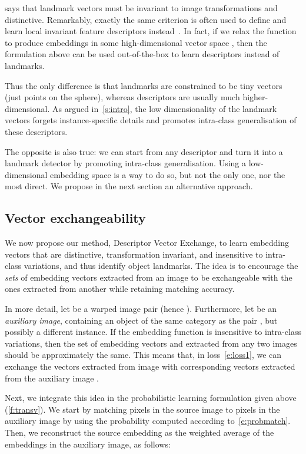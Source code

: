 \documentclass[10pt,twocolumn,letterpaper]{article}
\begin{document}
 says that landmark vectors must be invariant to image transformations and distinctive.
Remarkably, exactly the same criterion is often used to define and learn local invariant feature descriptors instead~\cite{brown10discriminative}.
In fact, if we relax the function  to produce embeddings in some high-dimensional vector space 
, then the formulation above can be used out-of-the-box to learn descriptors instead of landmarks.

Thus the only difference is that landmarks are constrained to be tiny vectors (just points on the sphere), whereas descriptors are usually much higher-dimensional.
As argued in~\cref{s:intro}, the low dimensionality of the landmark vectors forgets instance-specific details and promotes intra-class generalisation of these descriptors.

The opposite is also true: we can start from any descriptor and turn it into a landmark detector by promoting intra-class generalisation.
Using a low-dimensional embedding space is a way to do so, but not the only one, nor the most direct.
We propose in the next section an alternative approach.

\subsection{Vector exchangeability}\label{s:exchange}

We now propose our method, Descriptor Vector Exchange, to learn embedding vectors that are distinctive, transformation invariant, and insensitive to intra-class variations, and thus identify object landmarks.
The idea is to encourage the \emph{sets} of embedding vectors extracted from an image to be exchangeable with the ones extracted from another while retaining matching accuracy.

In more detail, let  be a warped image pair (hence ).
Furthermore, let  be an \emph{auxiliary image}, containing an object of the same category as the pair , but possibly a different instance.
If the embedding function  is insensitive to intra-class variations, then the set of embedding vectors  and  extracted from any two images should be approximately the same.
This means that, in loss~\eqref{e:loss1}, we can exchange the vectors  extracted from image  with corresponding vectors extracted from the auxiliary image .

Next, we integrate this idea in the probabilistic learning formulation given above (\cref{f:transv}).
We start by matching pixels in the source image  to pixels in the auxiliary image  by using the probability  computed according to~\cref{e:probmatch}.
Then, we reconstruct the source embedding  as the weighted average of the embeddings  in the auxiliary image, as follows:
\end{document}
